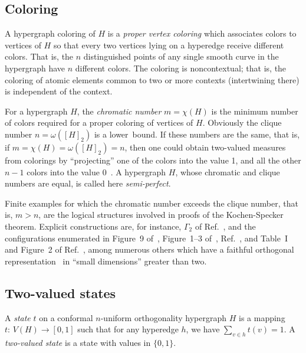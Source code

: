 \documentclass[%
12pt,
prereprint,
showpacs,
showkeys,
preprintnumbers,
amsmath,amssymb,
aps,
pra,
longbibliography,
notitlepage
]{revtex4-1}
\theoremstyle{definition}
\begin{document}
	\subsection{Coloring}
	
	A hypergraph coloring of $H$ is a \emph{proper vertex coloring} which associates colors to vertices of $H$ so that every two vertices lying on a hyperedge receive different colors. That is, the $n$ distinguished points of any single smooth curve in the hypergraph have $n$ different colors.
	The coloring is noncontextual; that is, the coloring of atomic elements common to two or more contexts (intertwining there)
	is independent of the context.
	
	For a hypergraph $H$, the \emph{chromatic number} $m=\chi(H)$ is the minimum number of colors required for a proper coloring of vertices of $H$. Obviously the clique number $n=\omega([H]_2 )$ is a lower~bound. If these numbers are the same, that is, if $m=\chi(H)=\omega([H]_2 )=n$, then one could obtain two-valued measures from colorings by ``projecting'' one of the colors into the value 1, and all the other $n-1$ colors into the value 0~\cite{godsil-zaks,meyer:99,havlicek-2000}. A hypergraph $H$, whose chromatic and clique numbers are equal, is called here \emph{semi-perfect}.
	
	
	Finite examples for which the chromatic number exceeds the clique number, that is, $m>n$,
	are the logical structures involved in proofs of the Kochen-Specker theorem.
	Explicit constructions are, for instance,
	$\Gamma_2$ of Ref.~\cite{kochen1},
	and the configurations enumerated in
	Figure~9 of~\cite{svozil-tkadlec},
	Figure~1--3 of~\cite{tkadlec-00},
	Ref.~\cite{cabello-96},
	and Table~I and Figure~2 of Ref.~\cite{2015-AnalyticKS},
	among numerous others
	which have a faithful orthogonal representation~\cite{lovasz-79,lovasz-89,Portillo-2015}
	in ``small dimensions'' greater than two.
	
	\subsection{Two-valued states}
	
	A \emph{state} $t$ on a conformal $n$-uniform orthogonality hypergraph $H$ is a mapping $t:\, V(H) \to [0,1]$ such that for any hyperedge $h$, we have $\sum_{v\in h} t(v)=1$. A \emph{two-valued state} is a state with values in $\{0,1\}$.
	
\end{document}
